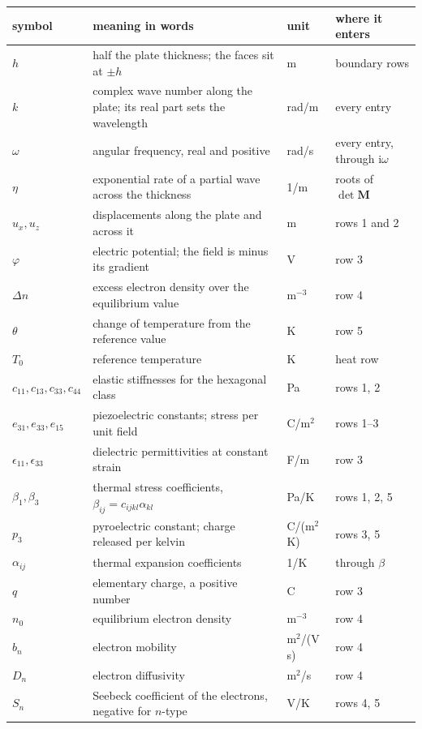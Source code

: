 \documentclass[11pt,a4paper]{article}
\newcommand{\ii}{\mathrm{i}}
\begin{document}
\begin{center}\footnotesize
\begin{tabular}{p{2.1cm}p{5.6cm}p{1.9cm}p{4.6cm}}
\toprule
symbol & meaning in words & unit & where it enters\\
\midrule
$h$ & half the plate thickness; the faces sit at $\pm h$ & m & boundary rows\\
$k$ & complex wave number along the plate; its real part sets the wavelength & rad/m & every entry\\
$\omega$ & angular frequency, real and positive & rad/s & every entry, through $\ii\omega$\\
$\eta$ & exponential rate of a partial wave across the thickness & 1/m & roots of $\det\mathbf M$\\
$u_x,u_z$ & displacements along the plate and across it & m & rows 1 and 2\\
$\varphi$ & electric potential; the field is minus its gradient & V & row 3\\
$\Delta n$ & excess electron density over the equilibrium value & m$^{-3}$ & row 4\\
$\theta$ & change of temperature from the reference value & K & row 5\\
$T_0$ & reference temperature & K & heat row\\
$c_{11},c_{13},c_{33},c_{44}$ & elastic stiffnesses for the hexagonal class & Pa & rows 1, 2\\
$e_{31},e_{33},e_{15}$ & piezoelectric constants; stress per unit field & C/m$^2$ & rows 1--3\\
$\epsilon_{11},\epsilon_{33}$ & dielectric permittivities at constant strain & F/m & row 3\\
$\beta_1,\beta_3$ & thermal stress coefficients, $\beta_{ij}=c_{ijkl}\alpha_{kl}$ & Pa/K & rows 1, 2, 5\\
$p_3$ & pyroelectric constant; charge released per kelvin & C/(m$^2$K) & rows 3, 5\\
$\alpha_{ij}$ & thermal expansion coefficients & 1/K & through $\beta$\\
$q$ & elementary charge, a positive number & C & row 3\\
$n_0$ & equilibrium electron density & m$^{-3}$ & row 4\\
$b_n$ & electron mobility & m$^2$/(V\,s) & row 4\\
$D_n$ & electron diffusivity & m$^2$/s & row 4\\
$S_n$ & Seebeck coefficient of the electrons, negative for $n$-type & V/K & rows 4, 5\\

\end{tabular}
\end{center}
\end{document}

